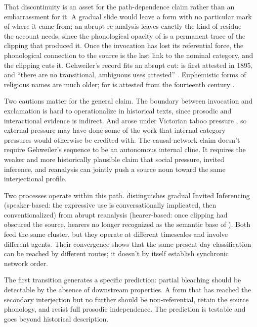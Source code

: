 \documentclass[12pt]{article}
\begin{document}
That discontinuity is an asset for the path-dependence claim rather than
an embarrassment for it. A gradual slide would leave a form with no
particular mark of where it came from; an abrupt re-analysis leaves exactly
the kind of residue the account needs, since the phonological opacity of
 is a permanent trace of the clipping that produced it. Once
the invocation has lost its referential force, the phonological connection
to the source is the last link to the nominal category, and the clipping
cuts it. Gehweiler's record fits an abrupt cut:  is first
attested in 1895, and \enquote{there are no transitional, ambiguous uses
attested} \citep[85--86]{gehweiler2008}. Euphemistic forms of religious
names are much older;  for  is attested from the
fourteenth century \citep[81]{gehweiler2008}.

Two cautions matter for the general claim. The boundary between
invocation and exclamation is hard to operationalize in historical
texts, since prosodic and interactional evidence is indirect. And
 arose under Victorian taboo pressure
\citep[85--86]{gehweiler2008}, so external pressure may have done some of
the work that internal category pressures would otherwise be credited
with. The causal-network claim doesn't require Gehweiler's sequence
to be an autonomous internal cline. It requires the weaker and more
historically plausible claim that social pressure, invited inference,
and reanalysis can jointly push a source noun toward the same
interjectional profile.

Two processes operate within this path.
\textcite[71--72, 88]{gehweiler2008} distinguishes gradual Invited
Inferencing (speaker-based: the expressive use is conversationally
implicated, then conventionalized) from abrupt reanalysis (hearer-based:
once clipping had obscured the source, hearers no longer recognized
 as the semantic base of ).
Both feed the same cluster, but they operate at different timescales and
involve different agents. Their convergence shows that the same present-day
classification can be reached by different routes; it doesn't by itself
establish synchronic network order.

The first transition generates a specific prediction: partial bleaching
should be detectable by the absence of downstream properties. A form that
has reached the secondary interjection but no further should be
non-referential, retain the source phonology, and resist full prosodic
independence.
The prediction is testable and goes beyond historical description.
\end{document}
